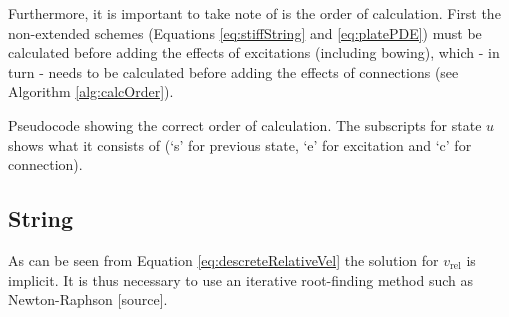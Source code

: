 \documentclass{article}
\begin{document}
Furthermore, it is important to take note of is the order of calculation. First the non-extended schemes (Equations \eqref{eq:stiffString} and \eqref{eq:platePDE}) must be calculated before adding the effects of excitations (including bowing), which - in turn - needs to be calculated before adding the effects of connections (see Algorithm \ref{alg:calcOrder}).

\begin{algorithm}[h]\label{alg:calcOrder}
 \caption{Pseudocode showing the correct order of calculation. The subscripts for state $u$ shows what it consists of (`s' for previous state, `e' for excitation and `c' for connection).}
\end{algorithm}



\subsection{String}


As can be seen from Equation \eqref{eq:descreteRelativeVel} the solution for $v_\text{rel}$ is implicit. It is thus necessary to use an iterative root-finding method such as Newton-Raphson [source].
\end{document}
